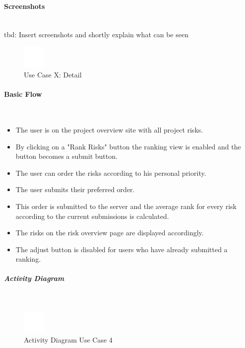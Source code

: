 \paragraph*{Screenshots}\mbox{}\\
tbd: Insert screenshots and shortly explain what can be seen

\begin{figure}[h] 
	\centering
	\includegraphics[width=0.1\textwidth]{Content/Domain/placeholder.png}
	\caption{Use Case X: Detail}
	\label{fig:label4}
\end{figure}

\paragraph*{Basic Flow} \mbox{}\\
\begin{itemize}
	\vspace{-3mm}
	\setlength\itemsep{-1em}
	\item The user is on the project overview site with all project risks.
	\item By clicking on a "Rank Risks" button the ranking view is enabled and the button becomes a submit button.
	\item The user can order the risks according to his personal priority.
	\item The user submits their preferred order.
	\item This order is submitted to the server and the average rank for every risk according to the current submissions is calculated.
	\item The risks on the risk overview page are displayed accordingly.
	\item The adjust button is disabled for users who have already submitted a ranking.
\end{itemize}

\subparagraph{Activity Diagram}\mbox{}\\
\begin{figure}[h]
	\centering
	\includegraphics[width=0.1\textwidth]{Content/Domain/placeholder.png}
	\caption{Activity Diagram Use Case 4}
	\label{fig:label44}
\end{figure}

